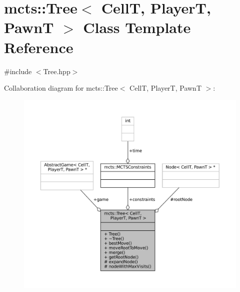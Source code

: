 \hypertarget{classmcts_1_1_tree}{}\section{mcts\+:\+:Tree$<$ CellT, PlayerT, PawnT $>$ Class Template Reference}
\label{classmcts_1_1_tree}


{\ttfamily \#include $<$Tree.\+hpp$>$}



Collaboration diagram for mcts\+:\+:Tree$<$ CellT, PlayerT, PawnT $>$\+:
\nopagebreak
\begin{figure}[H]
\begin{center}
\leavevmode
\includegraphics[width=350pt]{classmcts_1_1_tree__coll__graph}
\end{center}
\end{figure}
